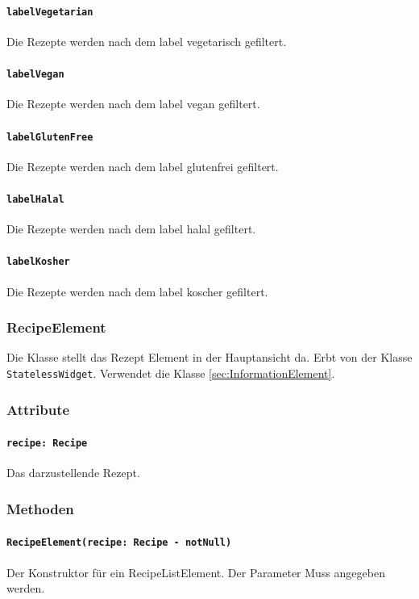\documentclass{entwurfsheft}
\begin{document}
            \paragraph*{\texttt{labelVegetarian}} Die Rezepte werden nach dem \gls{label} vegetarisch gefiltert.
            \paragraph*{\texttt{labelVegan}} Die Rezepte werden nach dem \gls{label} vegan gefiltert.
            \paragraph*{\texttt{labelGlutenFree}} Die Rezepte werden nach dem \gls{label} glutenfrei gefiltert.
            \paragraph*{\texttt{labelHalal}} Die Rezepte werden nach dem \gls{label} halal gefiltert.
            \paragraph*{\texttt{labelKosher}} Die Rezepte werden nach dem \gls{label} koscher gefiltert.

    \subsubsection*{RecipeElement}
        Die Klasse stellt das Rezept Element in der Hauptansicht da. Erbt von der Klasse \texttt{StatelessWidget}. Verwendet die Klasse \ref{sec:InformationElement}.
        \subsubsection*{Attribute}
            \paragraph*{\texttt{recipe: Recipe}} Das darzustellende Rezept.

        \subsubsection*{Methoden}
            \paragraph*{\texttt{RecipeElement(recipe: Recipe - notNull)}} Der Konstruktor für ein RecipeListElement. Der Parameter Muss angegeben werden.
\end{document}
